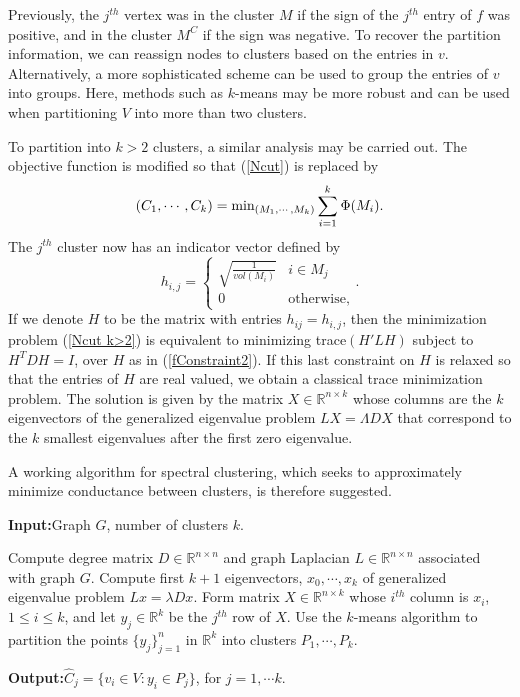 \documentclass[11pt]{article}
\renewcommand{\algorithmicrequire}{\textbf{Input:}}  %
\renewcommand{\algorithmicensure}{\textbf{Output:}} %
\begin{document}
Previously, the $j^{th}$ vertex was in the cluster $M$ if the sign of the $j^{th}$ entry of $f$ was positive, and in the cluster $M^C$ if the sign was negative. To recover the partition information, we can reassign nodes to clusters based on the entries in $v$. Alternatively, a more sophisticated scheme can be used to group the entries of $v$ into groups. Here, methods such as $k$-means may be more robust and can be used when partitioning $V$ into more than two clusters.

To partition into $k>2$ clusters, a similar analysis may be carried out. The objective function is modified so that (\ref{Ncut}) is replaced by
\begin{equation}\label{Ncut k>2}
(C_1,\cdots, C_k) = \text{min}_{(M_1,\cdots, M_k)}\sum_{i=1}^k\hspace{.1mm}\Phi(M_i).
\end{equation}
The $j^{th}$ cluster now has an indicator vector defined by
\begin{equation}\label{fConstraint2}
h_{i,j} = \begin{cases}
\sqrt{\frac{1}{vol(M_i)}} & i\in M_j \\
0 & \text{otherwise},
\end{cases}.
\end{equation}
If we denote $H$ to be the matrix with entries $h_{ij}= h_{i,j}$, then the minimization problem (\ref{Ncut k>2}) is equivalent to minimizing trace$(H'LH)$ subject to $H^TDH=I$, over $H$ as in (\ref{fConstraint2}). If this last constraint on $H$ is relaxed so that the entries of $H$ are real valued, we obtain a classical trace minimization problem. The solution is given by the matrix $X\in\mathbb{R}^{n\times k}$ whose columns are the $k$ eigenvectors of the generalized eigenvalue problem $LX=\Lambda DX$ that correspond to the $k$ smallest eigenvalues after the first zero eigenvalue.

A working algorithm for spectral clustering, which seeks to approximately minimize conductance between clusters, is therefore suggested.

\begin{algorithm}[H]
\algorithmicrequire  \hspace{2mm}Graph $G$, number of clusters $k$.
\begin{algorithmic}
	\State Compute degree matrix $D\in\mathbb{R}^{n\times n}$ and graph Laplacian $L\in\mathbb{R}^{n\times n}$ associated with graph $G$.
	\State Compute first $k+1$ eigenvectors, $x_0,\cdots, x_k$ of generalized eigenvalue problem $Lx=\lambda Dx$.
	\State Form matrix $X\in\mathbb{R}^{n\times k}$ whose $i^{th}$ column is $x_i$, $1\leq i\leq k$, and let $y_j\in\mathbb{R}^k$ be the $j^{th}$ row of $X$.
    \State Use the $k$-means algorithm to partition the points $\{y_j\}_{j=1}^n$ in $\mathbb{R}^k$ into clusters $P_1,\cdots, P_k$.
\end{algorithmic}
\algorithmicensure\hspace{2mm}$\hat C_j=\{v_i \in V: y_i\in P_j\}$, for $j=1,\cdots k$.
\caption{${\tt spec\_clust}(G,k)$} \label{alg:spec_clust}
\end{algorithm}
\end{document}
